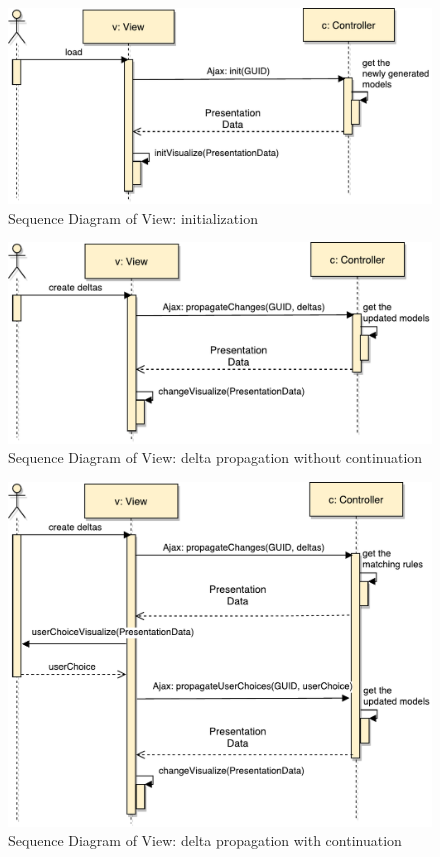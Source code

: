 \begin{figure}
	\centering
	\includegraphics[width=1\textwidth]{figures/Sequence_Diagram-View(init)}
	\caption{Sequence Diagram of View: initialization}
	\label{fig:Sequence_Diagram-View(init)}
\end{figure}

\begin{figure}
	\centering
	\includegraphics[width=1\textwidth]{figures/Sequence_Diagram-View(cont-false)}
	\caption{Sequence Diagram of View: delta propagation without continuation}
	\label{fig:Sequence_Diagram-View(cont-false)}
\end{figure}

\begin{figure}
	\centering
	\includegraphics[width=1\textwidth]{figures/Sequence_Diagram-View(cont-true)}
	\caption{Sequence Diagram of View: delta propagation with continuation}
	\label{fig:Sequence_Diagram-View(cont-true)}
\end{figure}

